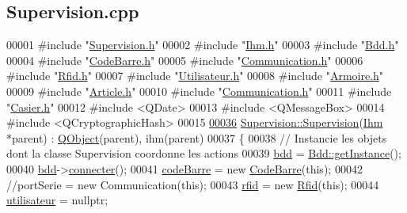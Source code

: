 \hypertarget{_supervision_8cpp_source}{}\subsection{Supervision.\+cpp}
\label{_supervision_8cpp_source}

\begin{DoxyCode}
00001 \textcolor{preprocessor}{#include "\hyperlink{_supervision_8h}{Supervision.h}"}
00002 \textcolor{preprocessor}{#include "\hyperlink{_ihm_8h}{Ihm.h}"}
00003 \textcolor{preprocessor}{#include "\hyperlink{_bdd_8h}{Bdd.h}"}
00004 \textcolor{preprocessor}{#include "\hyperlink{_code_barre_8h}{CodeBarre.h}"}
00005 \textcolor{preprocessor}{#include "\hyperlink{_communication_8h}{Communication.h}"}
00006 \textcolor{preprocessor}{#include "\hyperlink{_rfid_8h}{Rfid.h}"}
00007 \textcolor{preprocessor}{#include "\hyperlink{_utilisateur_8h}{Utilisateur.h}"}
00008 \textcolor{preprocessor}{#include "\hyperlink{_armoire_8h}{Armoire.h}"}
00009 \textcolor{preprocessor}{#include "\hyperlink{_article_8h}{Article.h}"}
00010 \textcolor{preprocessor}{#include "\hyperlink{_communication_8h}{Communication.h}"}
00011 \textcolor{preprocessor}{#include "\hyperlink{_casier_8h}{Casier.h}"}
00012 \textcolor{preprocessor}{#include <QDate>}
00013 \textcolor{preprocessor}{#include <QMessageBox>}
00014 \textcolor{preprocessor}{#include <QCryptographicHash>}
00015 
\hyperlink{class_supervision_af3f0ed8f5aadd6b4aa5e0eac2813d8c4}{00036} \hyperlink{class_supervision_af3f0ed8f5aadd6b4aa5e0eac2813d8c4}{Supervision::Supervision}(\hyperlink{class_ihm}{Ihm} *parent) : \hyperlink{class_q_object}{QObject}(parent), ihm(parent)
00037 \{
00038     \textcolor{comment}{// Instancie les objets dont la classe Supervision coordonne les actions}
00039     \hyperlink{class_supervision_ac9a970d4f511f2eed5da4aed037533ab}{bdd} = \hyperlink{class_bdd_a6f55c29d593da12ca31fad02f5adfe24}{Bdd::getInstance}();
00040     \hyperlink{class_supervision_ac9a970d4f511f2eed5da4aed037533ab}{bdd}->\hyperlink{class_bdd_a1a234e773787295f521d66685149176b}{connecter}();
00041     \hyperlink{class_supervision_ac01c57f7fd9d043ab46d439e55e426e5}{codeBarre} = \textcolor{keyword}{new} \hyperlink{class_code_barre}{CodeBarre}(\textcolor{keyword}{this});
00042     \textcolor{comment}{//portSerie = new Communication(this);}
00043     \hyperlink{class_supervision_a3ec5986105208e9a2b02b7e97bf61090}{rfid} = \textcolor{keyword}{new} \hyperlink{class_rfid}{Rfid}(\textcolor{keyword}{this});
00044     \hyperlink{class_supervision_a92384f2b12b2549cee988f83add8ad49}{utilisateur} = \textcolor{keyword}{nullptr};

\end{DoxyCode}
